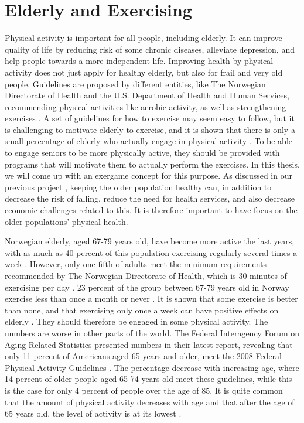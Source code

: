 \section{Elderly and Exercising}
\label{sec:exercisebehaviour}
Physical activity is important for all people, including elderly. It can improve quality of life by reducing risk of some chronic diseases, alleviate depression, and help people towards a more independent life. Improving health by physical activity does not just apply for healthy elderly, but also for frail and very old people. Guidelines are proposed by different entities, like The Norwegian Directorate of Health and the U.S. Department of Health and Human Services, recommending physical activities like aerobic activity, as well as strengthening exercises \cite{aktivitetsbok} \cite{guidelines}. A set of guidelines for how to exercise may seem easy to follow, but it is challenging to motivate elderly to exercise, and it is shown that there is only a small percentage of elderly who actually engage in physical activity \cite{olderamericans}. To be able to engage seniors to be more physically active, they should be provided with programs that will motivate them to actually perform the exercises. In this thesis, we will come up with an exergame concept for this purpose. As discussed in our previous project \cite{project}, keeping the older population healthy can, in addition to decrease the risk of falling, reduce the need for health services, and also decrease economic challenges related to this. It is therefore important to have focus on the older populations' physical health. 

Norwegian elderly, aged  67-79 years old, have become more active the last years, with as much as 40 percent of this population exercising regularly several times a week \cite{statisticsnorway}. However, only one fifth of adults meet the minimum requirements recommended by The Norwegian Directorate of Health, which is 30 minutes of exercising per day \cite{statistikknorge12}. 23 percent of the group between 67-79 years old in Norway exercise less than once a month or never \cite{statisticsnorway}. It is shown that some exercise is better than none, and that exercising only once a week can have positive effects on elderly \cite{gruppetrening-trheim}. They should therefore be engaged in some physical activity. The numbers are worse in other parts of the world. The Federal Interagency Forum on Aging Related Statistics \cite{olderamericans} presented numbers in their latest report, revealing that only 11 percent of Americans aged 65 years and older, meet the 2008 Federal Physical Activity Guidelines \cite{guidelines}. The percentage decrease with increasing age, where 14 percent of older people aged 65-74 years old meet these guidelines, while this is the case for only 4 percent of people over the age of 85. It is quite common that the amount of physical activity decreases with age and that after the age of 65 years old, the level of activity is at its lowest \cite{schutzer}. 
 
